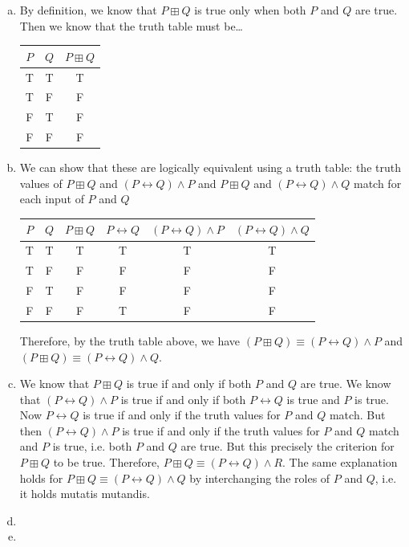 \documentclass[11pt,letterpaper]{article}
\begin{document}
\sol 
\begin{enumerate}[(a)]
\item By definition, we know that $P \boxplus Q$ is true only when both $P$ and $Q$ are true. Then we know that the truth table must be\dots \par
	\begin{table}[!ht]
	\centering
	\begin{tabular}{cc|c}
	$P$ & $Q$ & $P \boxplus Q$ \\ \hline
	T & T & T \\
	T & F & F \\
	F & T & F \\
	F & F & F
	\end{tabular}
	\end{table} \par
[Note: This is just the truth table for $P \wedge Q$ so that we must have $P \boxplus Q \equiv P \wedge Q$.] \pspace

\item We can show that these are logically equivalent using a truth table: the truth values of $P \boxplus Q$ and $(P \leftrightarrow Q) \wedge P$ and $P \boxplus Q$ and $(P \leftrightarrow Q) \wedge Q$ match for each input of $P$ and $Q$ \par
	\begin{table}[!ht]
	\centering
	\begin{tabular}{cc||c|c|cc}
	$P$ & $Q$ & $P \boxplus Q$ & $P \leftrightarrow Q$ & $(P \leftrightarrow Q) \wedge P$ & $(P \leftrightarrow Q) \wedge Q$ \\ \hline
	T & T & T & T & T & T \\
	T & F & F & F & F & F \\
	F & T & F & F & F & F \\
	F & F & F & T & F & F
	\end{tabular}
	\end{table}
Therefore, by the truth table above, we have $(P \boxplus Q) \equiv (P \leftrightarrow Q) \wedge P$ and $(P \boxplus Q) \equiv (P \leftrightarrow Q) \wedge Q$. \pspace

\item We know that $P \boxplus Q$ is true if and only if both $P$ and $Q$ are true. We know that $(P \leftrightarrow Q) \wedge P$ is true if and only if both $P \leftrightarrow Q$ is true and $P$ is true. Now $P \leftrightarrow Q$ is true if and only if the truth values for $P$ and $Q$ match. But then $(P \leftrightarrow Q) \wedge P$ is true if and only if the truth values for $P$ and $Q$ match and $P$ is true, i.e. both $P$ and $Q$ are true. But this precisely the criterion for $P \boxplus Q$ to be true. Therefore, $P \boxplus Q \equiv (P \leftrightarrow Q) \wedge R$. The same explanation holds for $P \boxplus Q \equiv (P \leftrightarrow Q) \wedge Q$ by interchanging the roles of $P$ and $Q$, i.e. it holds mutatis mutandis. \pspace

\item 
\item 
\end{enumerate}
\end{document}

